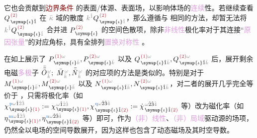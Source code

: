 它也会贡献到\textcolor{Maroon}{边界条件}  的表面/体源、表面场，以影响体场的\textcolor{Plum}{连续}性。若继续查看 $Q^{\;\! \textcolor{Maroon}{(2)}}_{\;\! \symup{\iota} \hat{1}}$ 在 $\mathcolor{gray}{\bar{\kappa}}$ 域的散度 $\mathcolor{gray}{k^{\hat{1}}} Q^{\;\! \textcolor{Maroon}{(2)}}_{\;\! \symup{\iota} \mathcolor{gray}{\hat{1}}}$，那么遵循与  相同的方法，却暂无法将 $\mathcolor{gray}{k^{\hat{1}}} Q^{\;\! \textcolor{Maroon}{(2)}}_{\;\! \symup{\iota} \mathcolor{gray}{\hat{1}}}$ 合并进 $P^{\;\! \textcolor{Maroon}{(2)}}_{\;\! \symup{\iota}}$ 的空间\textcolor{NavyBlue}{色散}项，除非\textcolor{Plum}{非线性}极化率对于其连接“\textcolor{Plum}{原因张量}”的对应角标，具有全排列\textcolor{Plum}{置换对称性} 。

在如上展示了 $P^{\;\! \textcolor{Maroon}{(1)} \mathcolor{gray}{\omega}}_{\;\! \symup{\iota}\mathcolor{gray}{\bar{k}}}, P^{\;\! \textcolor{Maroon}{(2)} \mathcolor{gray}{\omega}}_{\;\! \symup{\iota}\mathcolor{gray}{\bar{k}}}$ 以及 $Q^{\;\! \textcolor{Maroon}{(1)} \mathcolor{gray}{\omega}}_{\;\! \symup{\iota} \hat{1} \mathcolor{gray}{\bar{k}}}, Q^{\;\! \textcolor{Maroon}{(2)} \mathcolor{gray}{\omega}}_{\;\! \symup{\iota} \hat{1} \mathcolor{gray}{\bar{k}}}$ 后，展开剩余电磁\textcolor{Plum}{多极}子 $\bar{\bar{\bar{O}}}^{\;\!\mathcolor{gray}{\omega}}_{\;\!\mathcolor{gray}{\bar{k}}};$ $ \bar{M}^{\;\!\mathcolor{gray}{\omega}}_{\;\!\mathcolor{gray}{\bar{k}}},\bar{\bar{N}}^{\;\!\mathcolor{gray}{\omega}}_{\;\!\mathcolor{gray}{\bar{k}}}$ 的对应项的方法是类似的。特别是对于 $M^{\;\! \textcolor{Maroon}{(1)} \mathcolor{gray}{\omega}}_{\;\! \symup{\iota}\mathcolor{gray}{\bar{k}}}, M^{\;\! \textcolor{Maroon}{(2)} \mathcolor{gray}{\omega}}_{\;\! \symup{\iota}\mathcolor{gray}{\bar{k}}}$ 以及 $N^{\;\! \textcolor{Maroon}{(1)} \mathcolor{gray}{\omega}}_{\;\! \symup{\iota} \hat{1} \mathcolor{gray}{\bar{k}}}, N^{\;\! \textcolor{Maroon}{(2)} \mathcolor{gray}{\omega}}_{\;\! \symup{\iota} \hat{1} \mathcolor{gray}{\bar{k}}}$，对二者的展开几乎完全等价于 ，只需将极化率（如 $\chi^{\;\! \textcolor{NavyBlue}{\text{p}} \mathcolor{gray}{\omega} \hat{1} \mathcolor{gray}{\hat{2} \hat{3}}}_{\;\! \symup{\iota} \textcolor{Maroon}{(1)}} := \chi^{\;\! \mathcolor{gray}{\omega} \hat{1} \mathcolor{gray}{\hat{2} \hat{3}}}_{\;\! \symup{\iota} \textcolor{Maroon}{(1)}}, \chi^{\;\! \textcolor{NavyBlue}{\text{q}} \mathcolor{gray}{\omega} \hat{2} \hat{3} \mathcolor{gray}{\hat{4}}}_{\;\! \symup{\iota} \hat{1} \textcolor{Maroon}{(2)}} := \dot{\chi}^{\;\! \mathcolor{gray}{\omega} \hat{2} \hat{3} \mathcolor{gray}{\hat{4}}}_{\;\! \symup{\iota} \hat{1} \textcolor{Maroon}{(2)}}$ 等）改为磁化率（如 $\eta^{\;\! \textcolor{NavyBlue}{\text{m}} \mathcolor{gray}{\omega} \hat{1} \mathcolor{gray}{\hat{2} \hat{3}}}_{\;\! \symup{\iota} \textcolor{Maroon}{(1)}}, \eta^{\;\! \textcolor{NavyBlue}{\text{n}} \mathcolor{gray}{\omega} \hat{2} \hat{3} \mathcolor{gray}{\hat{4}}}_{\;\! \symup{\iota} \hat{1} \textcolor{Maroon}{(2)}}$ 等）即可，作为\textcolor{Plum}{（非）线性}、\textcolor{Plum}{（非）局域}\textcolor{NavyBlue}{驱动源}的\textcolor{NavyBlue}{场}项，仍然全以电场的空间导数展开，因为这样也包含了动态磁场及其时空导数\cite{vandendriesscheInfluenceMagneticFields2014}。


